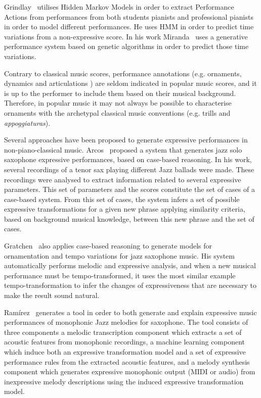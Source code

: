 Grindlay~\cite{Grindlay2006} utilises Hidden Markov Models in order to extract Performance Actions from performances from both students pianists and professional pianists in order to model different performances. He uses HMM in order to predict time variations from a non-expressive score. In his work Miranda~\cite{Miranda2010} uses a generative performance system based on genetic algorithms in order to predict those time variations. 

Contrary to classical music scores, performance annotations (e.g. ornaments, dynamics and articulations ) are seldom indicated in popular music scores, and it is up to the performer to include them based on their musical background. Therefore, in popular music it may not always be possible to characterise ornaments with the archetypal classical music conventions (e.g. trills and \textit{appoggiaturas}). 

Several approaches have been proposed to generate expressive performances in non-piano-classical music. Arcos~\cite{Arcos1998} proposed a system that generates jazz solo saxophone expressive performances, based on case-based reasoning. In his work, several recordings of a tenor sax playing different Jazz ballads were made. These recordings were analysed to extract information related to several expressive parameters. This set of parameters and the scores constitute the set of cases of a case-based system. From this set of cases, the system infers a set of possible expressive transformations for a given new phrase applying similarity criteria, based on background musical knowledge, between this new phrase and the set of cases.

Gratchen~\cite{Grachten2006} also applies case-based reasoning to generate models for ornamentation and tempo variations for jazz saxophone music. His system automatically performs melodic and expressive analysis, and when a new musical performance must be tempo-transformed, it uses the most similar example tempo-transformation to infer the changes of expressiveness that are necessary to make the result sound natural.

Ramírez~\cite{Ramirez2006} generates a tool in order to both generate and explain expressive music performances of monophonic Jazz melodies for saxophone. The tool consists of three components a melodic transcription component which extracts a set of acoustic features from monophonic recordings, a machine learning component which induce both an expressive transformation model and a set of expressive performance rules from the extracted acoustic features, and a melody synthesis component which generates expressive monophonic output (MIDI or audio) from inexpressive melody descriptions using the induced expressive transformation model.

